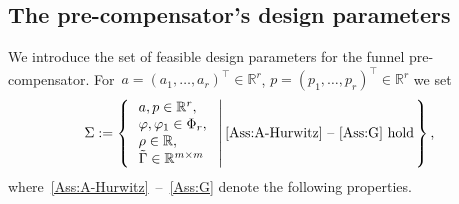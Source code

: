 \documentclass[ envcountsect, envcountsame]{svjour3}
\newcommand{\setdef}[2]{\left\{\, #1\, \left|\, \vphantom{#1} #2 \right.\right\}}
\newcommand{\R}{\mathbb{R}}
\newcommand{\vp}{\varphi}
\begin{document}
\subsection{The pre-compensator's design parameters} \label{Sec:Parameter}
We introduce the set of feasible design parameters for the funnel pre-compensator. 
For~$a = (a_1,\ldots,a_{r})^\top \in \R^r$, $p = (p_1,\ldots,p_r)^\top \in \R^r$ we set
\begin{equation*} %
\Sigma := \setdef{ \begin{array}{l}
 a, p \in \R^r, \\
\vp, \vp_1 \in \Phi_r, \\
\rho \in \R, \\
\tilde \Gamma \in \R^{m \times m} \\
\end{array} }{\text{\ref{Ass:A-Hurwitz}~--~\ref{Ass:G} hold}} ,
\end{equation*}
where~\ref{Ass:A-Hurwitz}~--~\ref{Ass:G} denote the following properties.
%
\end{document}
